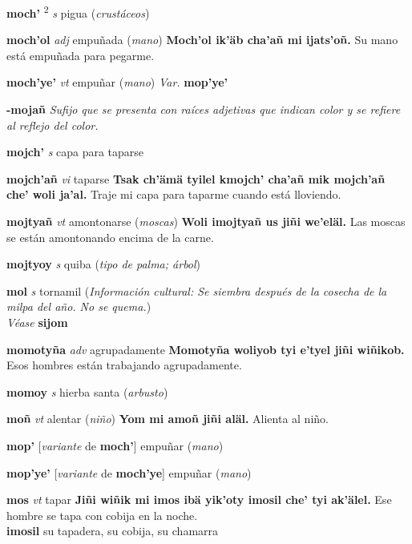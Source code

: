 \documentclass[10pt]{scrbook}
\newcommand{\entry}[1]{\textbf{#1}}
\newcommand{\defsuperscript}[1]{\textsuperscript{#1}}
\newcommand{\nontranslationdef}[1]{\textit{#1}}
\newcommand{\partofspeech}[1]{\textit{#1}}
\newcommand{\spanishtranslation}[1]{#1}
\newcommand{\clarification}[1]{(\textit{#1})}
\newcommand{\cholexample}[1]{\textbf{#1}}
\newcommand{\exampletranslation}[1]{#1}
\newcommand{\alsosee}[1]{\\\textit{Véase} \textbf{#1}}
\newcommand{\culturalinformation}[1]{(\textit{#1})}
\newcommand{\secondaryentry}[1]{\\\textbf{#1}}
\newcommand{\secondtranslation}[1]{#1}
\newcommand{\variation}[1]{\textit{Var.} \textbf{#1}}
\newcommand{\conjugationtense}[1]{[\textit{#1}}
\newcommand{\conjugationverb}[1]{de \textbf{#1}]}
\begin{document}
\begin{multicols}{2}
\entry{moch'}
\defsuperscript{2}
\partofspeech{s}
\spanishtranslation{pigua}
\clarification{crustáceos}

\entry{moch'ol}
\partofspeech{adj}
\spanishtranslation{empuñada}
\clarification{mano}
\cholexample{Moch'ol ik'äb cha'añ mi ijats'oñ.}
\exampletranslation{Su mano está empuñada para pegarme.}

\entry{moch'ye'}
\partofspeech{vt}
\spanishtranslation{empuñar}
\clarification{mano}
\variation{mop'ye'}

\entry{-mojañ}
\nontranslationdef{Sufijo que se presenta con raíces adjetivas que indican color y se refiere al reflejo del color.}

\entry{mojch'}
\partofspeech{s}
\spanishtranslation{capa para taparse}

\entry{mojch'añ}
\partofspeech{vi}
\spanishtranslation{taparse}
\cholexample{Tsak ch'ämä tyilel kmojch' cha'añ mik mojch'añ che' woli ja'al.}
\exampletranslation{Traje mi capa para taparme cuando está lloviendo.}

\entry{mojtyañ}
\partofspeech{vt}
\spanishtranslation{amontonarse}
\clarification{moscas}
\cholexample{Woli imojtyañ us jiñi we'eläl.}
\exampletranslation{Las moscas se están amontonando encima de la carne.}

\entry{mojtyoy}
\partofspeech{s}
\spanishtranslation{quiba}
\clarification{tipo de palma; árbol}

\entry{mol}
\partofspeech{s}
\spanishtranslation{tornamil}
\culturalinformation{Información cultural: Se siembra después de la cosecha de la milpa del año. No se quema.}
\alsosee{sijom}

\entry{momotyña}
\partofspeech{adv}
\spanishtranslation{agrupadamente}
\cholexample{Momotyña woliyob tyi e'tyel jiñi wiñikob.}
\exampletranslation{Esos hombres están trabajando agrupadamente.}

\entry{momoy}
\partofspeech{s}
\spanishtranslation{hierba santa}
\clarification{arbusto}

\entry{moñ}
\partofspeech{vt}
\spanishtranslation{alentar}
\clarification{niño}
\cholexample{Yom mi amoñ jiñi aläl.}
\exampletranslation{Alienta al niño.}

\entry{mop'}
\conjugationtense{variante}
\conjugationverb{moch'}
\spanishtranslation{empuñar}
\clarification{mano}

\entry{mop'ye'}
\conjugationtense{variante}
\conjugationverb{moch'ye}
\spanishtranslation{empuñar}
\clarification{mano}

\entry{mos}
\partofspeech{vt}
\spanishtranslation{tapar}
\cholexample{Jiñi wiñik mi imos ibä yik'oty imosil che' tyi ak'älel.}
\exampletranslation{Ese hombre se tapa con cobija en la noche.}
\secondaryentry{imosil}
\secondtranslation{su tapadera, su cobija, su chamarra}


\end{multicols}
\end{document}
